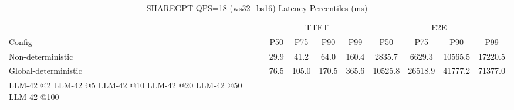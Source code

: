 \begin{table}[htbp]
\centering
\caption{SHAREGPT QPS=18 (ws32_bs16) Latency Percentiles (ms)}
\label{tab:sharegpt_qps18_ws32_bs16}
\begin{tabular}{l|cccc|cccc}
\toprule
& \multicolumn{4}{c|}{TTFT} & \multicolumn{4}{c}{E2E} \\
Config & P50 & P75 & P90 & P99 & P50 & P75 & P90 & P99 \\
\midrule
Non-deterministic & 29.9 & 41.2 & 64.0 & 160.4 & 2835.7 & 6629.3 & 10565.5 & 17220.5 \\
Global-deterministic & 76.5 & 105.0 & 170.5 & 365.6 & 10525.8 & 26518.9 & 41777.2 & 71377.0 \\
LLM-42 @2%
LLM-42 @5%
LLM-42 @10%
LLM-42 @20%
LLM-42 @50%
LLM-42 @100%
\bottomrule
\end{tabular}
\end{table}
